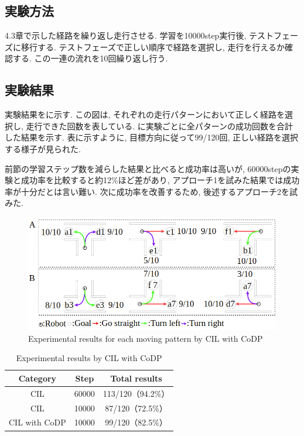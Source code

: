 \subsection{実験方法}
4.3章で示した経路を繰り返し走行させる. 学習を10000step実行後, テストフェーズに移行する. テストフェーズで正しい順序で経路を選択し, 走行を行えるか確認する. この一連の流れを10回繰り返し行う.
\subsection{実験結果}
実験結果をに示す. この図は, それぞれの走行パターンにおいて正しく経路を選択し, 走行できた回数を表している. に実験ごとに全パターンの成功回数を合計した結果を示す. 
表に示すように, 目標方向に従って99/120回, 正しい経路を選択する様子が見られた. 
\par
前節の学習ステップ数を減らした結果と比べると成功率は高いが, 60000stepの実験と成功率を比較すると約12\%ほど差があり, アプローチ1を試みた結果では成功率が十分だとは言い難い. 次に成功率を改善するため, 後述するアプローチ2を試みた.

\vspace{0.5cm}

\begin{figure}[hbtp]
  \centering
  \includegraphics[keepaspectratio, scale=0.47]
      {images/10000step_act1.0.png}
  \caption{Experimental results for each moving pattern by CIL with CoDP}
  \label{Fig:10000step_act1.0}
\end{figure}  


\begin{table}[hbtp]
  \caption{Experimental results by CIL with CoDP}
  \label{table:result3}
  \centering
  \begin{tabular}{|c|c|c|}
    \hline
    Category & Step & Total results\\
    \hline
    CIL & 60000 & 113/120（94.2\%）\\
    \hline
    CIL & 10000 & 87/120（72.5\%）\\
    \hline
    CIL with CoDP & 10000 & 99/120（82.5\%）\\
    \hline
  \end{tabular}
\end{table}

